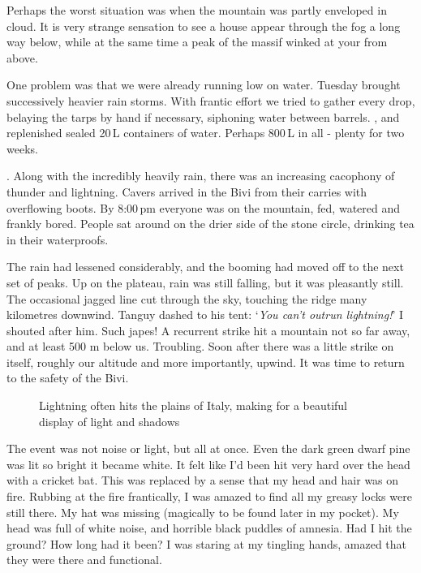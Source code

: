 Perhaps the worst situation was when the mountain was partly enveloped in cloud. It is very strange sensation to see a house appear through the fog a long way below, while at the same time a peak of the  massif winked at your from above. 

One problem was that we were already running low on water. Tuesday brought successively heavier rain storms. With frantic effort we tried to gather every drop, belaying the tarps by hand if necessary, siphoning water between barrels. , and replenished sealed 20\,L containers of water. Perhaps 800\,L in all - plenty for two weeks. 

. Along with the incredibly heavily rain, there was an increasing cacophony of thunder and lightning. Cavers arrived in the Bivi from their carries with overflowing boots. By 8:00\,pm everyone was on the mountain, fed, watered and frankly bored. People sat around on the drier side of the stone circle, drinking tea in their waterproofs. 

The rain had lessened considerably, and the booming had moved off to the next set of peaks. Up on the plateau, rain was still falling, but it was pleasantly still. The occasional jagged line cut through the sky, touching the ridge many kilometres downwind. Tanguy dashed to his tent: `\textit{You can't outrun lightning!}' I shouted after him. Such japes! A recurrent strike hit a mountain not so far away, and at least 500 m below us. Troubling. Soon after there was a little strike on  itself, roughly our altitude and more importantly, upwind. It was time to return to the safety of the Bivi.

\begin{figure}[t!]
\checkoddpage \ifoddpage \forcerectofloat \else \forceversofloat \fi
\centering
{}
\caption{Lightning often hits the plains of Italy, making for a beautiful display of light and shadows }
\label{lightning}
\end{figure}


The event was not noise or light, but all at once.  Even the dark green dwarf pine was lit so bright it became white. It felt like I'd been hit very hard over the head with a cricket bat. This was replaced by a sense that my head and hair was on fire. Rubbing at the fire frantically, I was amazed to find all my greasy locks were still there. My hat was missing (magically to be found later in my pocket). My head was full of white noise, and horrible black puddles of amnesia. Had I hit the ground? How long had it been? I was staring at my tingling hands, amazed that they were there and functional. 

